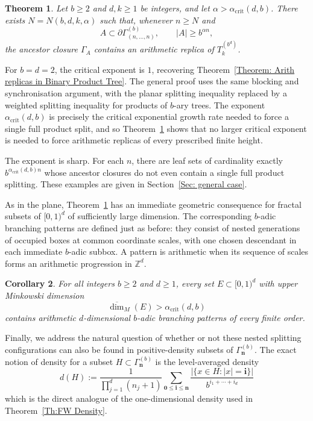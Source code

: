\documentclass[11pt]{amsart}
\newcommand{\Z}{\mathbb{Z}}  %
\newcommand\labs[1]{\left\lvert#1\right\rvert}
\renewcommand{\leq}{\leqslant}
\renewcommand{\geq}{\geqslant}
\theoremstyle{plain}
\newtheorem{thmAlph}{Theorem}[section]
\newtheorem{corAlph}[thmAlph]{Corollary}
\theoremstyle{definition}
\theoremstyle{remark}
\begin{document}
\begin{thmAlph}\label{Thm: Arith replicas in general leaf generated product trees}
Let $b\geq2$ and $d,k\geq1$ be integers, and let
$\alpha>\alpha_{\mathrm{crit}}(d,b)$.
There exists $N=N(b,d,k,\alpha)$ such that, whenever $n\geq N$ and
\[
A\subset\partial\Gamma_{(n,\ldots,n)}^{(b)},
\qquad
\labs{A}\geq b^{\alpha n},
\]
the ancestor closure $\Gamma_A$ contains an arithmetic replica of
$T_k^{(b^d)}$.
\end{thmAlph}

For $b=d=2$, the critical exponent is $1$, recovering
Theorem~\ref{Theorem: Arith replicas in Binary Product Tree}.
The general proof uses the same blocking and synchronisation
argument, with the planar splitting inequality replaced by a
weighted splitting inequality for products of $b$-ary trees.
The exponent $\alpha_{\mathrm{crit}}(d,b)$ is precisely the critical
exponential growth rate needed to force a single full product
split, and so Theorem~\ref{Thm: Arith replicas in general leaf generated product trees} shows that no larger critical exponent is needed
to force arithmetic replicas of every prescribed finite height.

The exponent is sharp. For each $n$, there are leaf sets of cardinality exactly $b^{\alpha_{\mathrm{crit}}(d,b)n}$ whose ancestor
closures do not even contain a single full product splitting. These examples are given in
Section~\ref{Sec: general case}.

As in the plane, Theorem~\ref{Thm: Arith replicas in general leaf generated product trees} has an immediate geometric consequence for fractal subsets of $[0,1)^d$ of sufficiently large dimension. The
corresponding $b$-adic branching patterns are defined just as before:
they consist of nested generations of occupied boxes at common
coordinate scales, with one chosen descendant in each immediate
$b$-adic subbox. A pattern is arithmetic when its sequence of
scales forms an arithmetic progression in $\Z^d$.
\begin{corAlph}
For all integers $b\geq2$ and $d\geq1$, every set
$E\subset[0,1)^d$ with upper Minkowski dimension
\[
\overline{\dim}_M(E)>\alpha_{\mathrm{crit}}(d,b)
\]
contains arithmetic $d$-dimensional $b$-adic branching patterns
of every finite order.
\end{corAlph}

Finally, we address the natural question of whether or not these nested splitting configurations can also be found in positive-density subsets of $\Gamma_{\mathbf n}^{(b)}$. The exact notion of density for a subset $H\subset\Gamma_{\mathbf n}^{(b)}$ is the level-averaged density
\[d(H):=\frac{1}{\prod_{j=1}^d(n_j+1)}
\sum_{\mathbf0\leq\mathbf i\leq\mathbf n}
\frac{\labs{\{x\in H:\labs{x}=\mathbf i\}}}{b^{i_1+\cdots+i_d}}\]
which is the direct analogue of the
one-dimensional density used in Theorem~\ref{Th:FW Density}.
\end{document}
